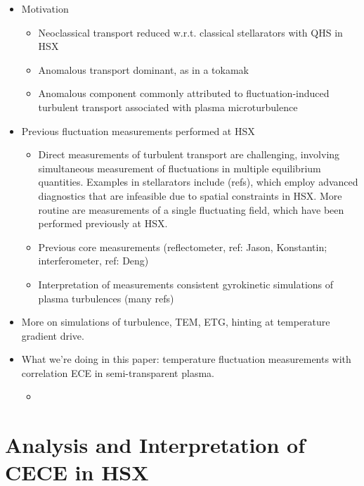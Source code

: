 \documentclass[%
 aip,
 amsmath,amssymb,
 reprint,%
]{revtex4-1}
\begin{document}
\begin{itemize}
    \item Motivation 
    \begin{itemize}
        \item Neoclassical transport reduced w.r.t. classical stellarators with QHS in HSX
        \item Anomalous transport dominant, as in a tokamak
        \item Anomalous component commonly attributed to fluctuation-induced turbulent transport associated with plasma microturbulence 
    \end{itemize}
    
    \item Previous fluctuation measurements performed at HSX
    \begin{itemize}
        \item Direct measurements of turbulent transport are challenging, involving simultaneous measurement of fluctuations in multiple equilibrium quantities. Examples in stellarators include (refs), which employ advanced diagnostics that are infeasible due to spatial constraints in HSX. More routine are measurements of a single fluctuating field, which have been performed previously at HSX.
        \item Previous core measurements (reflectometer, ref: Jason, Konstantin; interferometer, ref: Deng)
        \item Interpretation of measurements consistent gyrokinetic simulations of plasma turbulences (many refs)
    \end{itemize}

    \item More on simulations of turbulence, TEM, ETG, hinting at temperature gradient drive. 

    \item What we're doing in this paper: temperature fluctuation measurements with correlation ECE in semi-transparent plasma.
    \begin{itemize}
        \item 
    \end{itemize}
    
\end{itemize}

\section{\label{sec:methods}Analysis and Interpretation of CECE in HSX}
\end{document}
